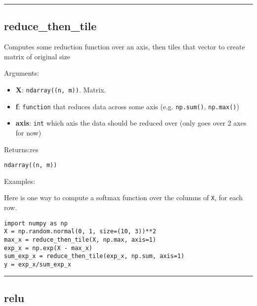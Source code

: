 \begin{center}\rule{0.5\linewidth}{\linethickness}\end{center}

\subsection{reduce\_then\_tile}\label{reduce_then_tile}

\begin{Shaded}
\begin{Highlighting}[]
\OperatorTok{=}\NormalTok{)}
\end{Highlighting}
\end{Shaded}

Computes some reduction function over an axis, then tiles that vector to
create matrix of original size

Arguments:

\begin{itemize}
\tightlist
\item
  \textbf{X}: \texttt{ndarray((n,\ m))}. Matrix.
\item
  \textbf{f}: \texttt{function} that reduces data across some axis (e.g.
  \texttt{np.sum()}, \texttt{np.max()})
\item
  \textbf{axis}: \texttt{int} which axis the data should be reduced over
  (only goes over 2 axes for now)
\end{itemize}

Returns:res

\texttt{ndarray((n,\ m))}

Examples:

Here is one way to compute a softmax function over the columns of
\texttt{X}, for each row.

\begin{verbatim}
import numpy as np
X = np.random.normal(0, 1, size=(10, 3))**2
max_x = reduce_then_tile(X, np.max, axis=1)
exp_x = np.exp(X - max_x)
sum_exp_x = reduce_then_tile(exp_x, np.sum, axis=1)
y = exp_x/sum_exp_x
\end{verbatim}

\begin{center}\rule{0.5\linewidth}{\linethickness}\end{center}

\subsection{relu}\label{relu}

